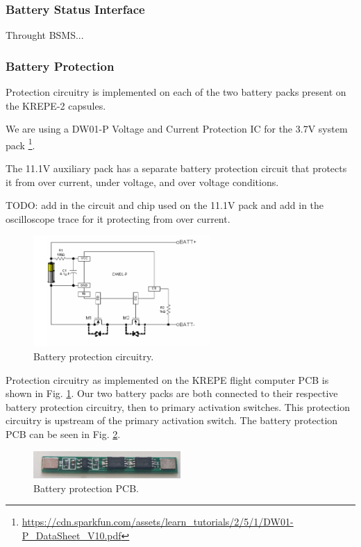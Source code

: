 \documentclass{article}
\begin{document}
\subsubsection{Battery Status Interface}
Throught BSMS...

\subsubsection{Battery Protection}
Protection circuitry is implemented on each of the two battery packs present on the KREPE-2 capsules. 

 We are using a DW01-P Voltage and Current Protection IC for the 3.7V system pack  \footnote{\url{https://cdn.sparkfun.com/assets/learn_tutorials/2/5/1/DW01-P_DataSheet_V10.pdf}}.

The 11.1V auxiliary pack has a separate battery protection circuit that protects it from over current, under voltage, and over voltage conditions.

TODO: add in the circuit and chip used on the 11.1V pack and add in the oscilloscope trace for it protecting from over current. 

\begin{figure}[H]
	\centering
	\includegraphics[width=0.6\textwidth]{images/dw108.png}
	\caption{Battery protection circuitry.}
	\label{fig:bat-protec}
\end{figure}



Protection circuitry as implemented on the KREPE flight computer PCB is shown in Fig. \ref{fig:bat-protec}. Our two battery packs are both connected to their respective battery protection circuitry, then  to primary activation switches. This protection circuitry is upstream of the primary activation switch. The battery protection PCB can be seen in Fig. \ref{fig:bat-protect}.



\begin{figure}[H]
	\centering
	\includegraphics[width=0.5\textwidth]{images/new_batt_prot.png}
	\caption{Battery protection PCB.}
	\label{fig:bat-protect}
\end{figure}
\end{document}
